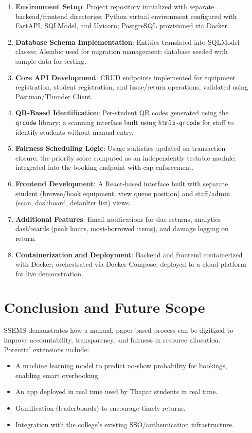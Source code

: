 \documentclass{article}
\begin{document}
\begin{enumerate}
    \item \textbf{Environment Setup}: Project repository initialized with separate backend/frontend directories; Python virtual environment configured with FastAPI, SQLModel, and Uvicorn; PostgreSQL provisioned via Docker.
    \item \textbf{Database Schema Implementation}: Entities translated into SQLModel classes; Alembic used for migration management; database seeded with sample data for testing.
    \item \textbf{Core API Development}: CRUD endpoints implemented for equipment registration, student registration, and issue/return operations, validated using Postman/Thunder Client.
    \item \textbf{QR-Based Identification}: Per-student QR codes generated using the \texttt{qrcode} library; a scanning interface built using \texttt{html5-qrcode} for staff to identify students without manual entry.
    \item \textbf{Fairness Scheduling Logic}: Usage statistics updated on transaction closure; the priority score computed as an independently testable module; integrated into the booking endpoint with cap enforcement.
    \item \textbf{Frontend Development}: A React-based interface built with separate student (browse/book equipment, view queue position) and staff/admin (scan, dashboard, defaulter list) views.
    \item \textbf{Additional Features}: Email notifications for due returns, analytics dashboards (peak hours, most-borrowed items), and damage logging on return.
    \item \textbf{Containerization and Deployment}: Backend and frontend containerized with Docker; orchestrated via Docker Compose; deployed to a cloud platform for live demonstration.
\end{enumerate}

\section{Conclusion and Future Scope}
SSEMS demonstrates how a manual, paper-based process can be digitized to improve accountability, transparency, and fairness in resource allocation. Potential extensions include:
\begin{itemize}
    \item A machine learning model to predict no-show probability for bookings, enabling smart overbooking.
    \item An app deployed in real time used by Thapar students in real time.
    \item Gamification (leaderboards) to encourage timely returns.
    \item Integration with the college's existing SSO/authentication infrastructure.
\end{itemize}
\end{document}
